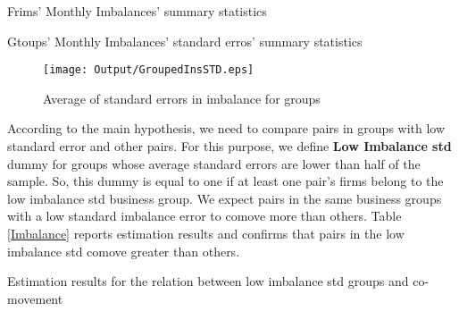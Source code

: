 	{\begin{table}[htbp]
		\centering
		\caption{Frims' Monthly Imbalances' summary statistics}
		\resizebox{0.75\textwidth}{!}{
			
		}
		\label{tab:ImbalanceInsMeanSummary}%
	\end{table}}
	{\begin{table}[htbp]
		\centering
		\caption{Gtoups' Monthly Imbalances' standard erros' summary statistics}
		\resizebox{0.75\textwidth}{!}{
			
		}
		\label{tab:ImbalanceInsStdSummary}%
\end{table}}
	\begin{figure}[htbp]
		\centering
		\texttt{[image: Output/GroupedInsSTD.eps]}
				\caption{Average of standard errors in imbalance for groups}
		\label{fig:GroupedInsSTD}
	\end{figure}
	
	According to the main hypothesis, we need to compare pairs in groups with low standard error and other pairs. For this purpose, we define \textbf{Low Imbalance std} dummy for groups whose average standard errors are lower than half of the sample. So, this dummy is equal to one if at least one pair's firms belong to the low imbalance std business group. We expect pairs in the same business groups with a low standard imbalance error to comove more than others. Table \ref{Imbalance} reports estimation results and confirms that pairs in the low imbalance std comove greater than others. 
	
		{\begin{table}[htbp]
			\centering
			\caption{Estimation results for the relation between low imbalance std groups and co-movement}
			\label{Imbalance}
			\resizebox{\textwidth}{!}{
				
			}
	\end{table}}



\FloatBarrier

